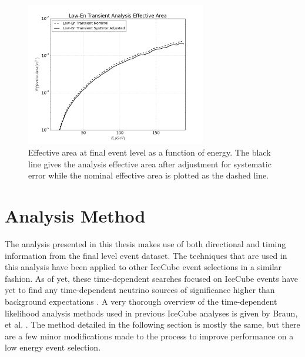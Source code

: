 \documentclass{gatech-thesis}
\begin{document}
\begin{figure}[ht]
  \begin{center}
    \includegraphics[width=0.7\textwidth,keepaspectratio]{LowEnTransient_EffArea_GENIE_WithSystematicAdjustedArea.png}
  \end{center}
  \caption{Effective area at final event level as a function of energy. The black line gives the analysis effective area after adjustment for systematic error while the nominal effective area is plotted as the dashed line.}
  \label{fig:SysAreaWithNom}
\end{figure}

\chapter{Analysis Method}

The analysis presented in this thesis makes use of both directional and timing information from the final level event dataset. The techniques that are used in this analysis have been applied to other IceCube event selections in a similar fashion. As of yet, these time-dependent searches focused on IceCube events have yet to find any time-dependent neutrino sources of significance higher than background expectations \cite{2012ApJ...744....1A}. A very thorough overview of the time-dependent likelihood analysis methods used in previous IceCube analyses is given by Braun, et al. \cite{2010APh....33..175B}. The method detailed in the following section is mostly the same, but there are a few minor modifications made to the process to improve performance on a low energy event selection.
\end{document}

